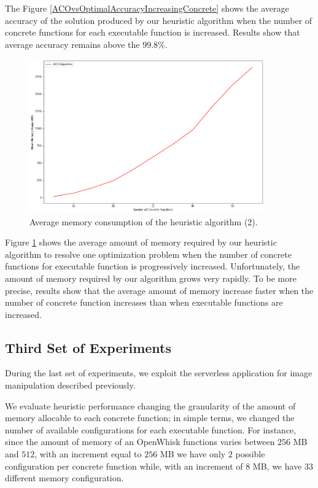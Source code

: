 \documentclass[12pt,a4paper]{report}
\begin{document}
The Figure \ref{ACOvsOptimalAccuracyIncreasingConcrete} shows the average accuracy of the solution produced by our heuristic algorithm when the number of concrete functions for each executable function is increased. Results show that average accuracy remains above the $99.8$\%.

\begin{figure}[h]
	\centering
	\includegraphics[width=0.9\textwidth]{./Images/ACORamConsumptionIncreasingConcrete.png}
	\caption{Average memory consumption of the heuristic algorithm (2).}%
	\label{ACORamConsumptionIncreasingConcrete}
\end{figure}

Figure \ref{ACORamConsumptionIncreasingConcrete} shows the average amount of memory required by our heuristic algorithm to resolve one optimization problem when the number of concrete functions for executable function is progressively increased. Unfortunately, the amount of memory required by our algorithm grows very rapidly. To be more precise, results show that the average amount of memory increase faster when the number of concrete function increases than when executable functions are increased.

\newpage
\subsection{Third Set of Experiments}

During the last set of experiments, we exploit the serverless application for image manipulation described previously.

We evaluate heuristic performance changing the granularity of the amount of memory allocable to each concrete function; in simple terms, we changed the number of available configurations for each executable function. For instance, since the amount of memory of an OpenWhisk functions varies between $256$ MB and $512$, with an increment equal to $256$ MB we have only $2$ possible configuration per concrete function while, with an increment of $8$ MB, we have $33$ different memory configuration.
\end{document}
